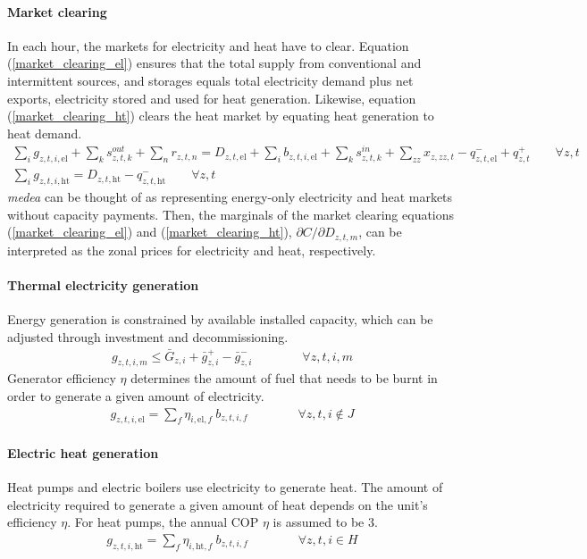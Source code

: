 \documentclass[11pt,a4paper]{article}
\begin{document}
\paragraph{Market clearing}
In each hour, the markets for electricity and heat have to clear.
Equation (\ref{market_clearing_el}) ensures that the total supply from conventional and intermittent sources, and storages equals total electricity demand plus net exports, electricity stored and used for heat generation. 
Likewise, equation (\ref{market_clearing_ht}) clears the heat market by equating heat generation to heat demand.
\begin{align}
\sum_{i} g_{z,t,i,\text{el}} + \sum_{k} s^{out}_{z,t,k} + \sum_{n} r_{z,t,n} =
D_{z,t,\text{el}} + \sum_{i} b_{z,t,i,\text{el}} + \sum_{k} s^{in}_{z,t,k} + \sum_{zz} x_{z,zz,t} 
- q^{-}_{z,t,\text{el}} + q^{+}_{z,t} \qquad \forall z,t \label{market_clearing_el} \\
\sum_{i} g_{z,t,i,\text{ht}} = D_{z,t,\text{ht}} - q^{-}_{z,t,\text{ht}} \qquad \forall z,t \label{market_clearing_ht}
\end{align}
\emph{medea} can be thought of as representing energy-only electricity and heat markets without capacity payments. Then, the marginals of the market clearing equations (\ref{market_clearing_el}) and (\ref{market_clearing_ht}), $\partial C / \partial D_{z,t,m}$, can be interpreted as the zonal prices for electricity and heat, respectively.

\paragraph{Thermal electricity generation}
Energy generation is constrained by available installed capacity, which can be adjusted through investment and decommissioning.
\begin{align}
g_{z,t,i,m} \leq \bar{G}_{z,i} + \bar{g}^{+}_{z,i} - \bar{g}^{-}_{z,i} \qquad \qquad \forall z,t,i,m
\end{align}
Generator efficiency $\eta$ determines the amount of fuel that needs to be burnt in order to generate a given amount of electricity.
\begin{align}
g_{z,t,i,\text{el}} = \sum_{f} \eta_{i,\text{el},f} \: b_{z,t,i,f} \qquad \qquad \forall z,t,i \notin J
\end{align}

\paragraph{Electric heat generation}
Heat pumps and electric boilers use electricity to generate heat. The amount of electricity required to generate a given amount of heat depends on the unit's efficiency $\eta$. For heat pumps, the annual COP $\eta$ is assumed to be $3$.
\begin{align}
g_{z,t,i,\text{ht}} = \sum_{f} \eta_{i,\text{ht},f} \: b_{z,t,i,f} \qquad \qquad \forall z,t,i \in H
\end{align}
\end{document}
